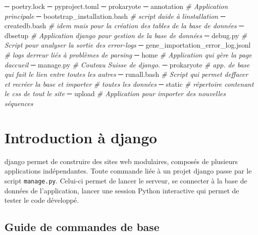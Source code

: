 \documentclass[
  openany]{book}
\newenvironment{Shaded}{\begin{snugshade}}{\end{snugshade}}
\newcommand{\CommentTok}[1]{\textcolor[rgb]{0.56,0.35,0.01}{\textit{#1}}}
\newcommand{\ExtensionTok}[1]{#1}
\newcommand{\NormalTok}[1]{#1}
\begin{document}
\begin{Shaded}
\begin{Highlighting}[]
\ExtensionTok{─}\NormalTok{ poetry.lock}
\ExtensionTok{─}\NormalTok{ pyproject.toml}
\ExtensionTok{─}\NormalTok{ prokaryote}
 \ExtensionTok{─}\NormalTok{ annotation }\CommentTok{\# Application principale}
 \ExtensionTok{─}\NormalTok{ bootstrap\_installation.bash }\CommentTok{\# script d\textquotesingle{}aide à l\textquotesingle{}installation}
 \ExtensionTok{─}\NormalTok{ createdb.bash }\CommentTok{\# idem mais pour la création des tables de la base de données}
 \ExtensionTok{─}\NormalTok{ dbsetup }\CommentTok{\# Application django pour gestion de la base de données}
 \ExtensionTok{─}\NormalTok{ debug.py }\CommentTok{\# Script pour analyser la sortie des error{-}logs }
 \ExtensionTok{─}\NormalTok{ gene\_importation\_error\_log.jsonl }\CommentTok{\# logs d\textquotesingle{}erreur liés à problèmes de parsing}
 \ExtensionTok{─}\NormalTok{ home }\CommentTok{\# Application qui gère la page d\textquotesingle{}accueil}
 \ExtensionTok{─}\NormalTok{ manage.py }\CommentTok{\# Couteau Suisse de django. }
 \ExtensionTok{─}\NormalTok{ prokaryote }\CommentTok{\# app. de base qui fait le lien entre toutes les autres}
 \ExtensionTok{─}\NormalTok{ runall.bash }\CommentTok{\# Script qui permet d\textquotesingle{}effacer et recréer la base et importer}
               \CommentTok{\# toutes les données}
 \ExtensionTok{─}\NormalTok{ static }\CommentTok{\# répertoire contenant le css de tout le site}
 \ExtensionTok{─}\NormalTok{ upload }\CommentTok{\# Application pour importer des nouvelles séquences}
\end{Highlighting}
\end{Shaded}

\hypertarget{django}{%
\chapter*{Introduction à django}\label{django}}

django permet de construire des sites web modulaires, composés de plusieurs
applications indépendantes. Toute commande liée à un projet django passe par
le script \texttt{manage.py}. Celui-ci permet de lancer le serveur, se connecter à la
base de données de l'application, lancer une session Python interactive qui permet
de tester le code développé.

\hypertarget{commands}{%
\section*{Guide de commandes de base}\label{commands}}
\end{document}
